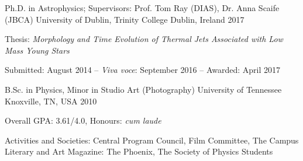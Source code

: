 \begin{cventries}
  \cventry
    {Ph.D. in Astrophysics; Supervisors: Prof. Tom Ray (DIAS), Dr. Anna Scaife (JBCA)}
    {University of Dublin, Trinity College}
    {Dublin, Ireland}
    {2017}
    {
      \begin{cvitems}
        \item {Thesis: \textit{Morphology and Time Evolution of  Thermal Jets Associated with Low Mass Young Stars} }
        \item {Submitted: August  2014 -- \textit{Viva voce}: September 2016 -- Awarded: April 2017}
      \end{cvitems}
    }
    
    \cventry
    {B.Sc. in Physics, Minor in Studio Art (Photography)}
    {University of Tennessee}
    {Knoxville, TN, USA}
    {2010}
    {
      \begin{cvitems}
        \item {Overall GPA: 3.61/4.0, Honours: \textit{cum laude}}
        \item {Activities and Societies: Central Program Council, Film Committee, The Campus Literary and Art Magazine: The Phoenix, The Society of Physics Students}
      \end{cvitems}
    }
\end{cventries}
